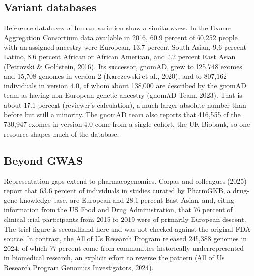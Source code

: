 \documentclass[12pt]{article}
\begin{document}
\subsection*{Variant databases}
Reference databases of human variation show a similar skew. In the Exome Aggregation Consortium data available in 2016, 60.9 percent of 60,252 people with an assigned ancestry were European, 13.7 percent South Asian, 9.6 percent Latino, 8.6 percent African or African American, and 7.2 percent East Asian (Petrovski \& Goldstein, 2016). Its successor, gnomAD, grew to 125,748 exomes and 15,708 genomes in version 2 (Karczewski et al., 2020), and to 807,162 individuals in version 4.0, of whom about 138,000 are described by the gnomAD team as having non-European genetic ancestry (gnomAD Team, 2023). That is about 17.1 percent (reviewer's calculation), a much larger absolute number than before but still a minority. The gnomAD team also reports that 416,555 of the 730,947 exomes in version 4.0 come from a single cohort, the UK Biobank, so one resource shapes much of the database.

\subsection*{Beyond GWAS}
Representation gaps extend to pharmacogenomics. Corpas and colleagues (2025) report that 63.6 percent of individuals in studies curated by PharmGKB, a drug-gene knowledge base, are European and 28.1 percent East Asian, and, citing information from the US Food and Drug Administration, that 76 percent of clinical trial participants from 2015 to 2019 were of primarily European descent. The trial figure is secondhand here and was not checked against the original FDA source. In contrast, the All of Us Research Program released 245,388 genomes in 2024, of which 77 percent come from communities historically underrepresented in biomedical research, an explicit effort to reverse the pattern (All of Us Research Program Genomics Investigators, 2024).
\end{document}
